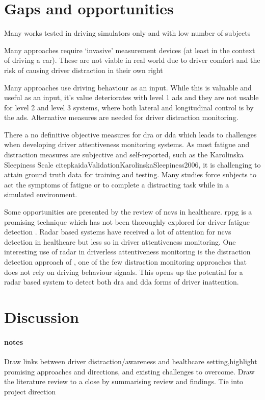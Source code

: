 \documentclass[11pt, parskip=half*,twoside=false]{scrbook}
\begin{document}
{\section{Gaps and opportunities}

Many works tested in driving simulators only and with low number of subjects

Many approaches require `invasive' measurement devices (at least in the context of driving a car). These are not viable in real world due to driver comfort and the risk of causing driver distraction in their own right

Many approaches use driving behaviour as an input. While this is valuable and useful as an input, it's value deteriorates with level 1 \gls{ads} and they are not usable for level 2 and level 3 systems, where both lateral and longitudinal control is by the \gls{ads}. Alternative measures are needed for driver distraction monitoring.

There a no definitive objective measures for \gls{dra} or \gls{dda} which leads to challenges when developing driver attentiveness monitoring systems. As most fatigue and distraction measures are subjective and self-reported, such as the Karolinska Sleepiness Scale citep{kaidaValidationKarolinskaSleepiness2006}, it is challenging to attain ground truth data for training and testing. Many studies force subjects to act the symptoms of fatigue or to complete a distracting task while in a simulated environment.

Some opportunities are presented by the review of \gls{ncvs} in healthcare. \gls{rppg} is a promising technique which has not been thoroughly explored for driver fatigue detection \citep{sikanderDriverFatigueDetection2019}. Radar based systems have received a lot of attention for \gls{ncvs} detection in healthcare \citep{sikanderDriverFatigueDetection2019} but less so in driver attentiveness monitoring. One interesting use of radar in driverless attentiveness monitoring is the distraction detection approach of \citet{dingInattentiveDrivingBehavior2019}, one of the few distraction monitoring approaches that does not rely on driving behaviour signals. This opens up the potential for a radar based system to detect both \gls{dra} and \gls{dda} forms of driver inattention.

\section{Discussion}
\paragraph{notes}
Draw links between driver distraction/awareness and healthcare setting,highlight promising approaches and directions, and existing challenges to overcome. Draw the literature review to a close by summarising review and findings. Tie into project direction

}
\end{document}
